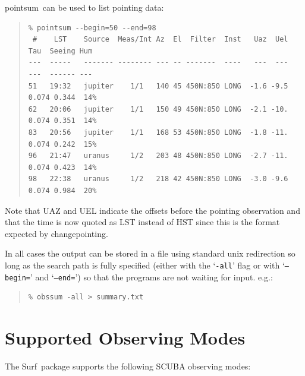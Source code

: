 \documentclass[twoside,11pt]{article}
\newcommand{\scusoft}          {{\sc Surf}}
\newcommand{\task}[1]{{\sf #1}}
\newcommand{\chgpnt}{\htmlref{\task{change\_pointing}}{CHANGE_POINTING}}
\newcommand{\pointsum}{\htmlref{\task{pointsum}}{POINTSUM}}
\newenvironment{myquote}{\begin{quote}\begin{small}}{\end{small}\end{quote}}
\newcommand{\htmlref}[2]{#1}
\newcommand{\xlabel}[1]{}
\renewcommand{\_}{\texttt{\symbol{95}}}
\begin{document}
\pointsum\ can be used to list pointing data:
\begin{myquote}
\begin{verbatim}
% pointsum --begin=50 --end=98
 #    LST    Source  Meas/Int Az  El  Filter  Inst   Uaz  Uel   Tau  Seeing Hum
---  -----   ------- -------- --- -- -------  ----   ---  ---   ---  ------ ---
51   19:32   jupiter    1/1   140 45 450N:850 LONG  -1.6 -9.5  0.074 0.344  14%
62   20:06   jupiter    1/1   150 49 450N:850 LONG  -2.1 -10.  0.074 0.351  14%
83   20:56   jupiter    1/1   168 53 450N:850 LONG  -1.8 -11.  0.074 0.242  15%
96   21:47   uranus     1/2   203 48 450N:850 LONG  -2.7 -11.  0.074 0.423  14%
98   22:38   uranus     1/2   218 42 450N:850 LONG  -3.0 -9.6  0.074 0.984  20%
\end{verbatim}
\end{myquote}
Note that UAZ and UEL indicate the offsets before the pointing observation
and that the time is now quoted as LST instead of HST since this is the format
expected by \chgpnt.

In all cases the output can be stored in a file using standard unix
redirection so long as the search path is fully specified (either with the
`\texttt{-all}' flag or with `\texttt{--begin=}' and `\texttt{--end=}') so
that the programs are not waiting for input. e.g.:
\begin{myquote}
\begin{verbatim}
% obssum -all > summary.txt
\end{verbatim}
\end{myquote}


\section{\xlabel{obsmodes}Supported Observing Modes\label{obsmodes}}

The \scusoft\ package supports the following SCUBA observing modes:
\end{document}
